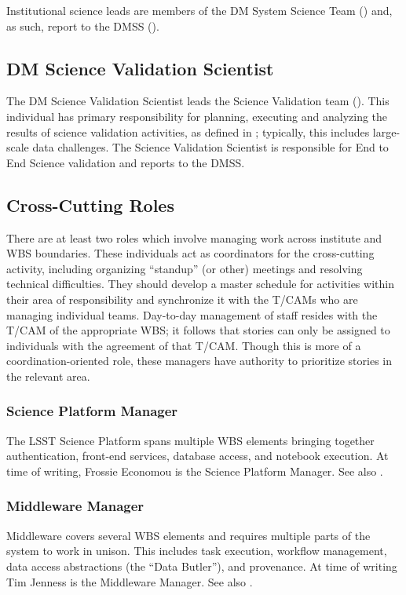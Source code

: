 Institutional science leads are members of the \gls{DM} System Science Team () and, as such, report to the \gls{DMSS} ().

\subsection{DM Science \gls{Validation} Scientist}
\label{role:dmsvs}

The \gls{DM} Science \gls{Validation} Scientist leads the Science \gls{Validation} team ().
This individual has primary responsibility for planning, executing and analyzing the results of science validation activities, as defined in ; typically, this includes large-scale data challenges.
The Science \gls{Validation} Scientist is responsible for End to End Science validation and reports to the \gls{DMSS}.

\subsection{Cross-Cutting Roles}\label{role:crosscut}

There are at least two roles which involve managing work across institute and \gls{WBS} boundaries.
These individuals act as coordinators for the cross-cutting activity, including organizing ``standup'' (or other) meetings and resolving technical difficulties.
They should develop a master schedule for activities within their area of responsibility and synchronize it with the T/CAMs who are managing individual teams.
Day-to-day management of staff resides with the \gls{T/CAM} of the appropriate \gls{WBS}; it follows that stories can only be assigned to individuals with the agreement of that \gls{T/CAM}.
Though this is more of a coordination-oriented role, these managers have authority to prioritize stories in the relevant area.

\subsubsection{Science Platform Manager}\label{role:lsplead}

The \gls{LSST} \gls{Science Platform} spans multiple \gls{WBS} elements bringing together authentication, front-end services, database access, and notebook execution.
At time of writing, Frossie Economou is the \gls{Science Platform} Manager.
See also .

\subsubsection{Middleware Manager}\label{role:mwlead}

Middleware covers several \gls{WBS} elements and requires multiple parts of the system to work in unison.
This includes task execution, workflow management, data access abstractions (the ``Data \gls{Butler}''), and \gls{provenance}.
At time of writing Tim Jenness is the Middleware Manager.
See also .
